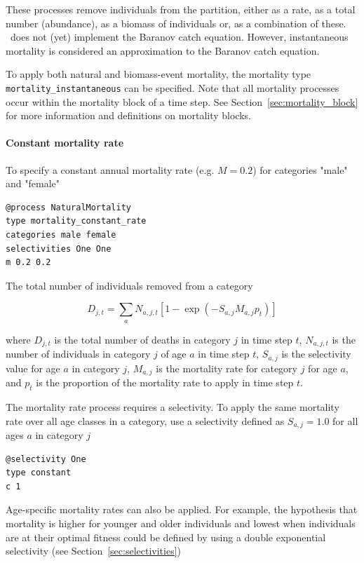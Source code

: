 These processes remove individuals from the partition, either as a rate, as a total number (abundance), as a biomass of individuals or, as a combination of these. \CNAME\ does not (yet) implement the Baranov catch equation. However, instantaneous mortality is considered an approximation to the Baranov catch equation.

To apply both natural and biomass-event mortality, the mortality type \texttt{mortality\_instantaneous} can be specified. Note that all mortality processes occur within the mortality block of a time step. See Section~\ref{sec:mortality_block} for more information and definitions on mortality blocks.

\paragraph{Constant mortality rate}

To specify a constant annual mortality rate (e.g. $M=0.2$) for categories "male" and "female"

{\small{\begin{verbatim}
@process NaturalMortality
type mortality_constant_rate
categories male female
selectivities One One
m 0.2 0.2
\end{verbatim}}}

The total number of individuals removed from a category

\begin{equation}
D_{j,t} = \sum_a N_{a,j,t} [1 - \exp(-S_{a,j} M_{a,j} p_t)]
\end{equation}

where $D_{j,t}$ is the total number of deaths in category $j$ in time step $t$, $N_{a,j,t}$ is the number of individuals in category $j$ of age $a$ in time step $t$, $S_{a,j}$ is the selectivity value for age $a$ in category $j$, $M_{a,j}$ is the mortality rate for category $j$ for age $a$, and $p_t$ is the proportion of the mortality rate to apply in time step $t$.

The mortality rate process requires a selectivity. To apply the same mortality rate over all age classes in a category, use a selectivity defined as $S_{a,j}=1.0$ for all ages $a$ in category $j$

{\small{\begin{verbatim}
@selectivity One
type constant
c 1
\end{verbatim}}}

Age-specific mortality rates can also be applied. For example, the hypothesis that mortality is higher for younger and older individuals and lowest when individuals are at their optimal fitness could be defined by using a double exponential selectivity (see Section~\ref{sec:selectivities})

